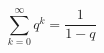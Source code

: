 \documentclass[14pt]{article}
\begin{document}
\pagestyle{empty}
\[ \sum\limits_{k=0}^{\infty} q^k = \frac{1}{1-q} \]
\end{document}
